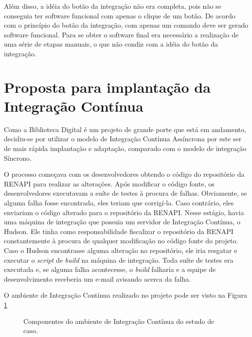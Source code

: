 Além disso, a idéia do botão da integração não era completa, pois não se conseguia ter software funcional com apenas o clique de um botão. De acordo com o princípio do botão da integração, com apenas um comando deve ser gerado software funcional. Para se obter o software final era necessário a realização de uma série de etapas manuais, o que não condiz com a idéia do botão da integração.

\section{Proposta para implantação da Integração Contínua}

Como a Biblioteca Digital é um projeto de grande porte que está em andamento, decidiu-se por utilizar o modelo de Integração Contínua Assíncrona por este ser de mais rápida implantação e adaptação, comparado com o modelo de integração Síncrono.

O processo começava com os desenvolvedores obtendo o código do repositório da RENAPI para realizar as alterações. Após modificar o código fonte, os desenvolvedores executavam a suíte de testes à procura de falhas. Obviamente, se alguma falha fosse encontrada, eles teriam que corrigí-la. Caso contrário, eles enviariam o código alterado para o repositório da RENAPI.
Nesse estágio, havia uma máquina de integração que possuia um servidor de Integração Contínua, o Hudson. Ele tinha como responsabilidade fiscalizar o repositório da RENAPI constantemente à procura de qualquer modificação no código fonte do projeto. Caso o Hudson encontrasse alguma alteração no repositório, ele iria resgatar e executar o \textit{script} de \textit{build} na máquina de integração. Toda suíte de testes era executada e, se alguma falha acontecesse, o \textit{build} falharia e a equipe de desenvolvimento receberia um e-mail avisando acerca da falha.

O ambiente de Integração Contínua realizado no projeto pode ser visto na Figura \ref{componentes_estudo}

\begin{figure}[ht]
    \centering
    \caption{Componentes do ambiente de Integração Contínua do estudo de caso.}
    \label{componentes_estudo}
\end{figure}

